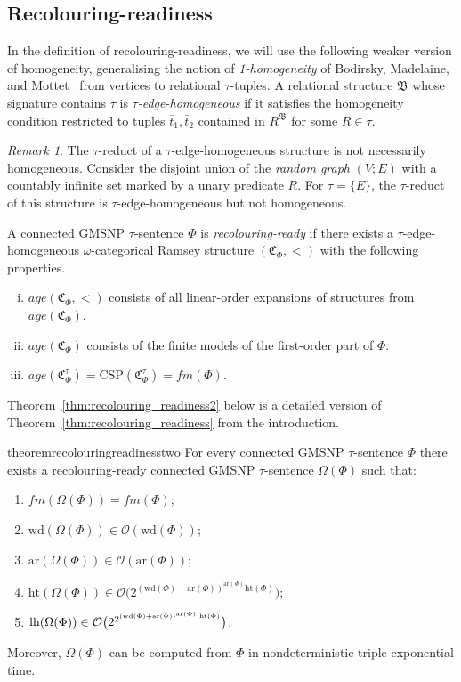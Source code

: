 \documentclass[oneside,reqno,12pt]{amsart}
\theoremstyle{plain}
\theoremstyle{remark}
\newtheorem{remark}[thm]{Remark}
\newcommand{\struct}[1]{\mathfrak{#1}}
\newcommand{\CSP}{\ensuremath{\mathrm{CSP}}\xspace}
\newcommand{\age}{\ensuremath{\mathit{age}}\xspace}
\newcommand{\fm}{\ensuremath{\mathit{fm}}\xspace}
\newcommand{\hh}{\ensuremath{\mathrm{ht}}\xspace}
\newcommand{\lh}{\ensuremath{\mathrm{lh}}\xspace}
\newcommand{\wh}{\ensuremath{\mathrm{wd}}\xspace}
\newcommand{\ar}{\ensuremath{\mathrm{ar}}\xspace}
\begin{document}
{\subsection{Recolouring-readiness} 
In the definition of recolouring-readiness, we will use the following weaker version of homogeneity, generalising the notion of \emph{1-homogeneity} of Bodirsky, Madelaine, and Mottet~\cite{bodirsky2018_article} from vertices to relational $\tau$-tuples. 
A relational structure $\struct{B}$ whose signature contains $\tau$ is \emph{$\tau$-edge-homogeneous} 
if it satisfies the homogeneity condition restricted to tuples $\bar{t}_1,\bar{t}_2$ contained in  $R^{\struct{B}}$ for some $R\in \tau$. 
\begin{remark} 
The $\tau$-reduct of a $\tau$-edge-homogeneous structure is not necessarily homogeneous.
Consider the disjoint union of the \emph{random graph} $(V;E)$ with a countably infinite set marked by a unary predicate $R$. For $\tau=\{E\}$, the $\tau$-reduct of this structure is $\tau$-edge-homogeneous but not homogeneous.
\end{remark} 
 A connected GMSNP $\tau$-sentence $\Phi$ is \emph{recolouring-ready} if there exists a $\tau$-edge-homogeneous $\omega$-categorical Ramsey structure $(\struct{C}_{\Phi},<)$  with the following properties. 
\begin{enumerate}[i.]
\item \label{item:1} $\age(\struct{C}_{\Phi},<)$ consists of all linear-order expansions of structures from $\age(\struct{C}_{\Phi})$. 
    \item \label{item:2} $\age(\struct{C}_{\Phi})$ consists of the finite models of  the first-order part of $\Phi$. 
    \item \label{item:3}  $\age(\struct{C}_{\Phi}^{\tau})=\CSP(\struct{C}_{\Phi}^{\tau})=\fm(\Phi)$.  
\end{enumerate} 
 
Theorem~\ref{thm:recolouring_readiness2} below is a detailed version of Theorem~\ref{thm:recolouring_readiness} from the introduction.
\begin{restatable}{theorem}{recolouringreadinesstwo}    \label{thm:recolouring_readiness2}   
   For every connected GMSNP $\tau$-sentence $\Phi$ there exists  a  recolouring-ready connected 
 GMSNP $\tau$-sentence $\Omega(\Phi)$ such that: 
\begin{enumerate} 
 \item \label{item:ready1} $\fm(\Omega(\Phi))=\fm(\Phi)$;
 \item \label{item:ready2} $\wh(\Omega(\Phi))\in\mathcal{O}(\wh(\Phi))$;
 \item \label{item:ready3} $\ar(\Omega(\Phi))\in\mathcal{O}(\ar(\Phi))$;
 \item \label{item:ready4} $\hh(\Omega(\Phi))\in\mathcal{O}\bigl(2^{(\wh(\Phi)+\ar(\Phi))^{\ar(\Phi)}\hh(\Phi)}\bigr)$;
 \item \label{item:ready5} $\lh(\Omega(\Phi))\in\mathcal{O}\bigl(2^{2^{(\wh(\Phi)+\ar(\Phi))\smash{^{\ar(\Phi)}}\cdot\hh(\Phi)}}\bigr)$.
\end{enumerate}   
 Moreover, $\Omega(\Phi)$ can be computed from $\Phi$ in nondeterministic triple-exponential time.


\end{restatable}}
\end{document}
